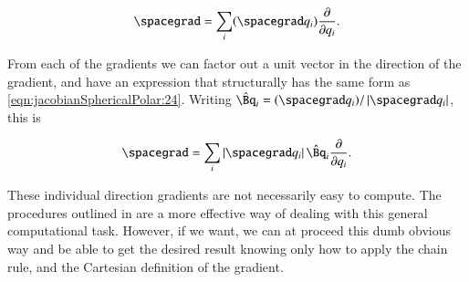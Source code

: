 \begin{align}\label{eqn:jacobianSphericalPolar:30}
\spacegrad = \sum_i (\spacegrad q_i) \PD{q_i}{}.
\end{align}

From each of the gradients we can factor out a unit vector in the direction of the gradient, and have an expression that structurally has the same form as \ref{eqn:jacobianSphericalPolar:24}.  Writing $\hat{\Bq}_i = (\spacegrad q_i)/\Abs{\spacegrad q_i}$, this is

\begin{align}\label{eqn:jacobianSphericalPolar:31}
\spacegrad = \sum_i \Abs{\spacegrad q_i} \hat{\Bq}_i \PD{q_i}{}.
\end{align}

These individual direction gradients are not necessarily easy to compute.  The procedures outlined in \cite{byron1992mca} are a more effective way of dealing with this general computational task.  However, if we want, we can at proceed this dumb obvious way and be able to get the desired result knowing only how to apply the chain rule, and the Cartesian definition of the gradient.

\EndArticle
